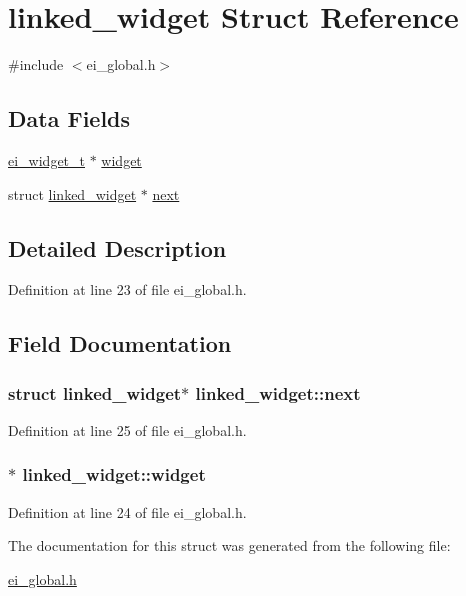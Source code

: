 \hypertarget{structlinked__widget}{
\section{linked\_\-widget Struct Reference}
\label{structlinked__widget}
}


{\ttfamily \#include $<$ei\_\-global.h$>$}\subsection*{Data Fields}
\begin{DoxyCompactItemize}
\item 
\hyperlink{structei__widget__t}{ei\_\-widget\_\-t} $\ast$ \hyperlink{structlinked__widget_ac33c6a39516d9638031b302e609f4804}{widget}
\item 
struct \hyperlink{structlinked__widget}{linked\_\-widget} $\ast$ \hyperlink{structlinked__widget_a38a2cee1b592d5e93a6d0660c98ea76f}{next}
\end{DoxyCompactItemize}


\subsection{Detailed Description}


Definition at line 23 of file ei\_\-global.h.

\subsection{Field Documentation}
\hypertarget{structlinked__widget_a38a2cee1b592d5e93a6d0660c98ea76f}{
\subsubsection[{next}]{\setlength{\rightskip}{0pt plus 5cm}struct {\bf linked\_\-widget}$\ast$ {\bf linked\_\-widget::next}}}
\label{structlinked__widget_a38a2cee1b592d5e93a6d0660c98ea76f}


Definition at line 25 of file ei\_\-global.h.\hypertarget{structlinked__widget_ac33c6a39516d9638031b302e609f4804}{
\subsubsection[{widget}]{$\ast$ {\bf linked\_\-widget::widget}}}
\label{structlinked__widget_ac33c6a39516d9638031b302e609f4804}


Definition at line 24 of file ei\_\-global.h.

The documentation for this struct was generated from the following file:\begin{DoxyCompactItemize}
\item 
\hyperlink{ei__global_8h}{ei\_\-global.h}\end{DoxyCompactItemize}

